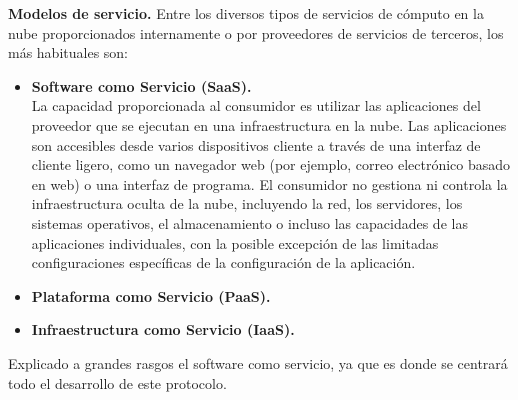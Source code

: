  \textbf{Modelos de servicio. }
Entre los diversos tipos de servicios de cómputo en la nube proporcionados internamente o por proveedores de servicios de terceros, los más habituales son:
\begin{itemize}
	\item \textbf {Software como Servicio (SaaS). } \\ La capacidad proporcionada al consumidor es utilizar las aplicaciones del proveedor que se ejecutan en una infraestructura en la nube. Las aplicaciones son accesibles desde varios dispositivos cliente a través de una interfaz de cliente ligero, como un navegador web (por ejemplo, correo electrónico basado en web) o una interfaz de programa. El consumidor no gestiona ni controla la infraestructura oculta de la nube, incluyendo la red, los servidores, los sistemas operativos, el almacenamiento o incluso las capacidades de las aplicaciones individuales, con la posible excepción de las limitadas configuraciones específicas de la configuración de la aplicación.
	\item \textbf {Plataforma como Servicio (PaaS). } 
	\item \textbf {Infraestructura como Servicio (IaaS). } 
\end{itemize}  

Explicado a grandes rasgos el software como servicio, ya que es donde se centrará todo el desarrollo de este protocolo.




